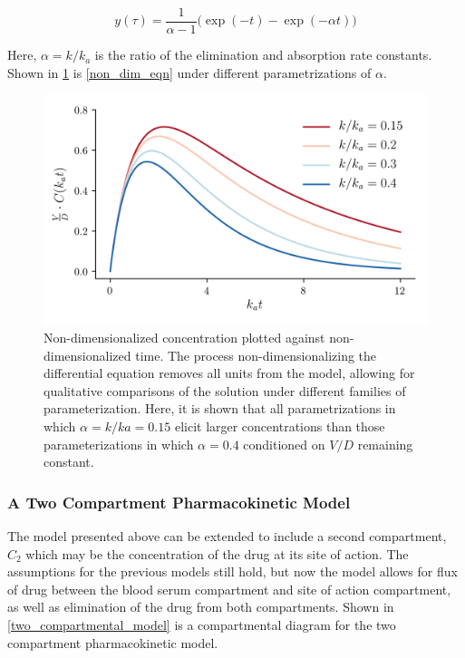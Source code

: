 \begin{equation}\label{non_dim_eqn}
	y(\tau) = \dfrac{1}{\alpha-1} \Big(  \exp(-t) - \exp(-\alpha t) \Big)
\end{equation}

\noindent Here, $ \alpha = k/k_a $ is the ratio of the elimination and absorption rate constants.  Shown in \cref{fig:pkcureves} is \cref{non_dim_eqn} under different parametrizations of $\alpha$.  

\begin{figure}[h!]
	\centering
	\includegraphics{figures/pkcurves.png}
	\caption[Non-dimensionalized solutions to pharmacokinetic differential equation] {Non-dimensionalized concentration plotted against non-dimensionalized time.  The process non-dimensionalizing the differential equation removes all units from the model, allowing for qualitative comparisons of the solution under different families of parameterization.  Here, it is shown that all parametrizations in which $\alpha = k/ka = 0.15$ elicit larger concentrations than those parameterizations in which $\alpha=0.4$ conditioned on $V/D$ remaining constant.}
	\label{fig:pkcureves}
\end{figure}


\subsubsection{A Two Compartment Pharmacokinetic Model}

The model presented above can be extended to include a second compartment, $C_2$ which may be the concentration of the drug at its site of action.  The assumptions for the previous models still hold, but now the model allows for flux of drug between the blood serum compartment and site of action compartment, as well as elimination of the drug from both compartments. Shown in \cref{two_compartmental_model} is a compartmental diagram for the two compartment pharmacokinetic model.

